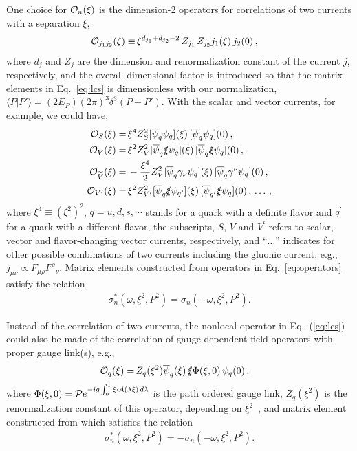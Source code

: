 \documentclass[twocolumn,aps,prl,superscriptaddress,nofootinbib,showpacs]{revtex4-1}
\begin{document}
One choice for ${\cal O}_n({\xi})$ is the dimension-2 operators for correlations of two currents with a separation $\xi$,
\begin{align}\label{eq:2currents}
{\cal O}_{j_1j_2}(\xi)\equiv
&\,
\xi^{d_{j_1}+d_{j_2}-2}\, Z_{j_1}\, Z_{j_2} j_1(\xi)\, j_2(0)\, ,
\end{align}
where $d_j$ and $Z_j$ are the dimension and renormalization constant of the current $j$, respectively, and the overall dimensional factor is introduced so that the matrix elements in Eq.~\eqref{eq:lcs} is dimensionless with our normalization, $\langle P|P'\rangle = (2E_P)(2\pi)^3\delta^3(P-P')$.  With the scalar and vector currents, for example, we could have,
\begin{subequations}\label{eq:operators}
\begin{align}
{\cal O}_{S}(\xi)=&\,\xi^4 Z^{2}_S[\overline{\psi}_q{\psi}_{q}](\xi)\,[\overline{\psi}_{q}{\psi}_q](0)\, ,\\
{\cal O}_{V}(\xi)=&\,\xi^2Z^{2}_V[\overline{\psi}_q\slashed{\xi}{\psi}_{q}](\xi)\,[\overline{\psi}_{q}\slashed{\xi}{\psi}_q](0)\, ,\\
{\cal O}_{\widetilde V}(\xi)=&\,-\frac{\xi^4}{2}Z^{2}_V[\overline{\psi}_q\gamma_\nu{\psi}_{q}](\xi)\,[\overline{\psi}_{q}\gamma^\nu{\psi}_q](0)\, ,\\
{\cal O}_{V^\prime}(\xi)=&\,\xi^2Z^{2}_{V^\prime}[\overline{\psi}_q\slashed{\xi}{\psi}_{q^\prime}](\xi)\,[\overline{\psi}_{q^\prime}\slashed{\xi}{\psi}_q](0)\, , \, \dots \, ,
\end{align}
\end{subequations}
where $\xi^4\equiv (\xi^2)^2$, $q=u, d, s,\cdots$ stands for a quark with a definite flavor and $q^\prime$ for a quark with a different flavor, the subscripts, $S$, $V$ and $V^\prime$ refers to scalar, vector and flavor-changing vector currents, respectively, and ``$\dots$'' indicates for other possible combinations of two currents including the gluonic current, e.g., $j_{\mu\nu}\propto F_{\mu\rho}{F^{\rho}}_\nu$. Matrix elements constructed from operators in Eq.~\eqref{eq:operators} satisfy the relation
\begin{align}\label{eq:rel1}
{\sigma}^*_{n}(\omega,\xi^2,P^2)={\sigma}_{n}(-\omega,\xi^2,P^2).
\end{align}

Instead of the correlation of two currents, the nonlocal operator in Eq.~(\ref{eq:lcs}) could also be made of the correlation of gauge dependent field operators with proper gauge link(s), e.g.,
\begin{align}\label{eq:operators2}
{\cal O}_{q}(\xi)=&\,Z_q(\xi^2)\overline{\psi}_q(\xi)\,\slashed{\xi} \Phi(\xi,0)\,{\psi}_q(0)\, ,
\end{align}
where $\Phi(\xi,0)={\cal P}e^{-ig\int_0^{1} \xi\cdot A(\lambda\xi)\,d\lambda}$ is the path ordered gauge link, $Z_q(\xi^2)$ is the renormalization constant of this operator, depending on $\xi^2$~\cite{Ishikawa:2017faj}, and matrix element constructed from which satisfies the relation
\begin{align}\label{eq:rel2}
{\sigma}^*_{n}(\omega,\xi^2,P^2)=-{\sigma}_{n}(-\omega,\xi^2,P^2).
\end{align}
\end{document}
